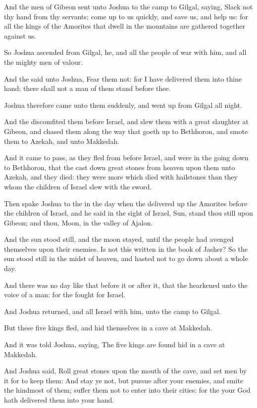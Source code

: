 \Verse And the men of Gibeon sent unto Joshua to the camp to Gilgal, saying, Slack not thy hand from thy servants; come up to us quickly, and save us, and help us: for all the kings of the Amorites that dwell in the mountains are gathered together against us.

\Verse So Joshua ascended from Gilgal, he, and all the people of war with him, and all the mighty men of valour.

\Verse And the \LORD said unto Joshua, Fear them not: for I have delivered them into thine hand; there shall not a man of them stand before thee.

\Verse Joshua therefore came unto them suddenly, and went up from Gilgal all night.

\Verse And the \LORD discomfited them before Israel, and slew them with a great slaughter at Gibeon, and chased them along the way that goeth up to Bethhoron, and smote them to Azekah, and unto Makkedah.

\Verse And it came to pass, as they fled from before Israel, and were in the going down to Bethhoron, that the \LORD cast down great stones from heaven upon them unto Azekah, and they died: they were more which died with hailstones than they whom the children of Israel slew with the sword.

\Verse Then spake Joshua to the \LORD in the day when the \LORD delivered up the Amorites before the children of Israel, and he said in the sight of Israel, Sun, stand thou still upon Gibeon; and thou, Moon, in the valley of Ajalon.

\Verse And the sun stood still, and the moon stayed, until the people had avenged themselves upon their enemies. Is not this written in the book of Jasher? So the sun stood still in the midst of heaven, and hasted not to go down about a whole day.

\Verse And there was no day like that before it or after it, that the \LORD hearkened unto the voice of a man: for the \LORD fought for Israel.

\Verse And Joshua returned, and all Israel with him, unto the camp to Gilgal.

\Verse But these five kings fled, and hid themselves in a cave at Makkedah.

\Verse And it was told Joshua, saying, The five kings are found hid in a cave at Makkedah.

\Verse And Joshua said, Roll great stones upon the mouth of the cave, and set men by it for to keep them: \Verse And stay ye not, but pursue after your enemies, and smite the hindmost of them; suffer them not to enter into their cities: for the \LORD your God hath delivered them into your hand.

